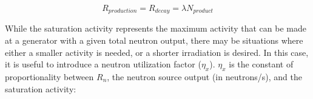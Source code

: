  \begin{equation}
R_{production} = R_{decay} = \lambda N_{product}
\end{equation}
% 
% 
% 
% 
% 
% 
% 
% 
% 
% 
% 


While the saturation activity represents the maximum activity that can be made at a generator with a given total neutron output, there may be situations where either a smaller activity is needed, or a shorter irradiation is desired. 
In this case, it is useful to introduce a neutron utilization factor ($\eta_x$).  $\eta_x$ is the constant of proportionality between $R_n$, the neutron source output (in neutrons/s), and the saturation activity:


